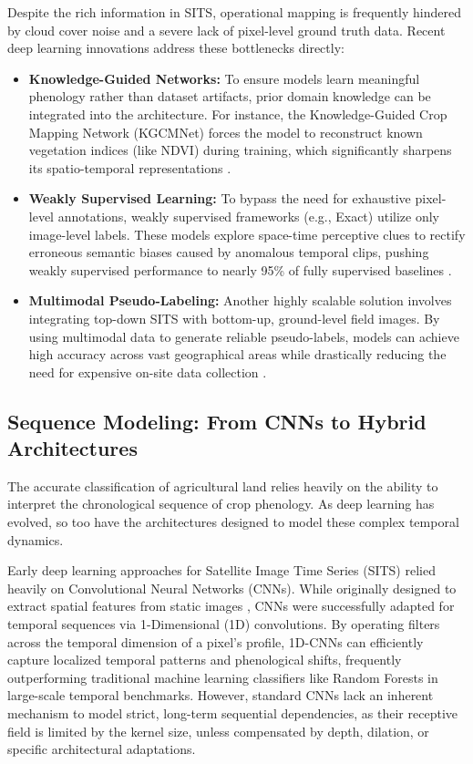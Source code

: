 Despite the rich information in SITS, operational mapping is frequently hindered by cloud cover noise and a severe lack of pixel-level ground truth data.
Recent deep learning innovations address these bottlenecks directly:
\begin{itemize}
    \item \textbf{Knowledge-Guided Networks:}
        To ensure models learn meaningful phenology rather than dataset artifacts, prior domain knowledge can be integrated into the architecture.
        For instance, the Knowledge-Guided Crop Mapping Network (KGCMNet) forces the model to reconstruct known vegetation indices (like NDVI) during training,
        which significantly sharpens its spatio-temporal representations \cite{qin_knowledge_2024}.
    \item \textbf{Weakly Supervised Learning:}
        To bypass the need for exhaustive pixel-level annotations, weakly supervised frameworks (e.g., Exact) utilize only image-level labels.
        These models explore space-time perceptive clues to rectify erroneous semantic biases caused by anomalous temporal clips,
        pushing weakly supervised performance to nearly 95\% of fully supervised baselines \cite{zhu_exact_2025}.
    \item \textbf{Multimodal Pseudo-Labeling:}
        Another highly scalable solution involves integrating top-down SITS with bottom-up, ground-level field images.
        By using multimodal data to generate reliable pseudo-labels, models can achieve high accuracy across vast geographical areas
        while drastically reducing the need for expensive on-site data collection \cite{abbas_multimodal_2025}.
\end{itemize}

\subsection{Sequence Modeling: From CNNs to Hybrid Architectures}
\label{subsec:sequence_modeling}

The accurate classification of agricultural land relies heavily on the ability to interpret the chronological sequence of crop phenology.
As deep learning has evolved, so too have the architectures designed to model these complex temporal dynamics.

Early deep learning approaches for Satellite Image Time Series (SITS) relied heavily on Convolutional Neural Networks (CNNs).
While originally designed to extract spatial features from static images \cite{kattenborn_review_2021},
CNNs were successfully adapted for temporal sequences via 1-Dimensional (1D) convolutions.
By operating filters across the temporal dimension of a pixel's profile, 1D-CNNs can efficiently capture localized temporal patterns and phenological shifts,
frequently outperforming traditional machine learning classifiers like Random Forests \cite{kussul_deep_2017} in large-scale temporal benchmarks.
However, standard CNNs lack an inherent mechanism to model strict, long-term sequential dependencies,
as their receptive field is limited by the kernel size, unless compensated by depth, dilation, or specific architectural adaptations.

